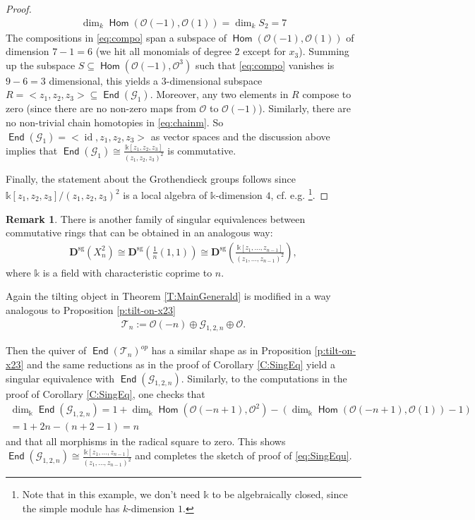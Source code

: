 \documentclass[a4paper,11pt, reqno]{amsart}
\def\DD{\mathbf D}
\def\OO{\mathcal O}
\def\sG{\mathscr{G}}
\def\sT{\mathscr{T}}
\def\id{{\operatorname{id}}}
\newcommand{\opname}[1]{\operatorname{\mathsf{#1}}}
\newcommand{\Hom}{\opname{Hom}}
\newcommand{\End}{\opname{End}}
\newcommand{\op}{^{op}}
\def\Dsg{\DD^{\mathrm{sg}}}
\theoremstyle{plain}
\theoremstyle{definition}
\newtheorem{remark}[dummy]{Remark}
\numberwithin{equation}{section}
\begin{document}
\begin{proof}
\begin{align}
           \dim_k \Hom(\OO(-1), \OO(1)) = \dim_k S_2=7
        \end{align}
        The compositions in \eqref{eq:compo} span a subspace of $\Hom(\OO(-1), \OO(1))$ of dimension $7-1=6$ (we hit all monomials of degree $2$ except for $x_3$). Summing up the subspace $S \subseteq  \Hom(\OO(-1), \OO^3)$ such that \eqref{eq:compo} vanishes is $9-6=3$ dimensional, this yields a $3$-dimensional subspace $R=<z_1, z_2, z_3> \subseteq \End(\sG_1)$. 
     Moreover, any two elements in $R$ compose to zero (since there are no non-zero maps from $\OO$ to $\OO(-1)$). 
Similarly, there are no non-trivial chain homotopies in \eqref{eq:chainm}. So $\End(\sG_1)=<\id, z_1, z_2, z_3>$ as vector spaces and the discussion above implies that $\End(\sG_1)\cong \frac{\mathbb{k}[z_1, z_2, z_3]}{(z_1, z_2, z_3)^2}$ is commutative. 

Finally, the statement about the Grothendieck groups follows since $\mathbb{k}[z_1, z_2, z_3]/(z_1, z_2, z_3)^2$ is a local algebra of $\mathbb{k}$-dimension $4$, cf. e.g. \cite[Proposition 5.2.]{kalck-karmazyn}\footnote{Note that in this example, we don't need $\mathbb{k}$ to be algebraically closed, since the simple module has $k$-dimension $1$.}.
\end{proof}

\begin{remark} 
    There is another family of singular equivalences between commutative rings \cite{YangPrivate, kalck-karmazyn} that can be obtained in an analogous way:
    \begin{align} \label{eq:SingEqu}
        \Dsg(X_n^2) \cong
        \Dsg\left(\frac{1}{n}(1,1)\right) \cong \Dsg\left(\frac{\mathbb{k}[z_1, \ldots, z_{n-1}]}{(z_1, \ldots, z_{n-1})^2}\right),
    \end{align}
    where $\mathbb{k}$ is a field with characteristic coprime to $n$. 

    Again the tilting object in Theorem \ref{T:MainGenerald} is modified in a way analogous to Proposition \ref{p:tilt-on-x23} 
    \begin{align}
        \sT_n:=\OO(-n) \oplus \sG_{1, 2, n} \oplus \OO.
    \end{align}
    
  Then the quiver of $\End(\sT_n)\op$ has a similar shape as in Proposition \ref{p:tilt-on-x23} and the same reductions as in the proof of Corollary \ref{C:SingEq} yield a singular equivalence with $\End(\sG_{1, 2, n})$. Similarly, to the computations in the proof of Corollary \ref{C:SingEq}, one checks that
  \begin{align}
        \dim_\mathbb{k} \End(\sG_{1, 2, n})=1 + \dim_\mathbb{k} \Hom(\OO(-n+1), \OO^2) - (\dim_\mathbb{k} \Hom(\OO(-n+1), \OO(1))-1)\\ =1 + 2n -(n+2-1) = n
  \end{align}
  and that all morphisms in the radical square to zero. This shows $\End(\sG_{1, 2, n})\cong \frac{\mathbb{k}[z_1, \ldots, z_{n-1}]}{(z_1, \ldots, z_{n-1})^2}$ and completes the sketch of proof of \eqref{eq:SingEqu}.
\end{remark}
\end{document}

